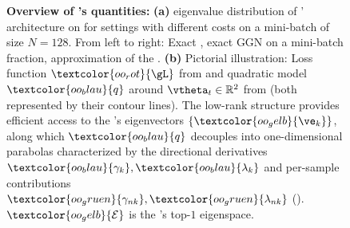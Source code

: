 \begin{figure}[!tb]
  \caption{
  \textbf{Overview of \vivittitle's quantities:}
\textbf{(a)} \ggn eigenvalue distribution of \deepobs' \threecthreed architecture on
\cifarten \cite{schneider2019deepobs}
for settings with different costs on a mini-batch of size $N = 128$.
From left to right: Exact \ggn,
exact GGN on a mini-batch fraction,
\mc approximation of the \ggn.
%
\textbf{(b)} Pictorial illustration: Loss function $\textcolor{oo_rot}{\gL}$
from  and quadratic model $\textcolor{oo_blau}{q}$
around $\vtheta_t \in \mathbb{R}^2$ from  (both
represented by their contour lines). The low-rank structure provides efficient
access to the \ggn{}'s eigenvectors $\{\textcolor{oo_gelb}{\ve_k}\}$, along
which $\textcolor{oo_blau}{q}$ decouples into one-dimensional parabolas
characterized by the directional derivatives $\textcolor{oo_blau}{\gamma_k},
\textcolor{oo_blau}{\lambda_k}$ and per-sample contributions
$\textcolor{oo_gruen}{\gamma_{nk}}, \textcolor{oo_gruen}{\lambda_{nk}}$
(). $\textcolor{oo_gelb}{\mathcal{E}}$ is the \ggn{}'s
top-$1$ eigenspace.}
  \label{fig:visual_abstract}
\end{figure}


